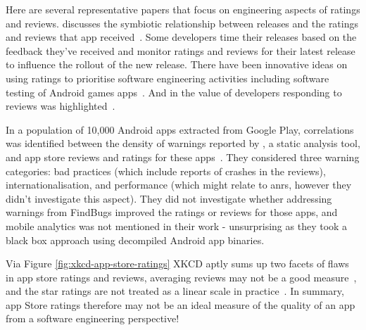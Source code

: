 Here are several representative papers that focus on engineering aspects of ratings and reviews.  \citeauthor{alsubaihin2019app_store_effects_on_software_engineering} discusses the symbiotic relationship between releases and the ratings and reviews that app received~. Some developers time their releases based on the feedback they've received and monitor ratings and reviews for their latest release to influence the rollout of the new release. There have been innovative ideas on using ratings to prioritise software engineering activities including software testing of Android games apps~. And in \citeauthor{greenheld2018_automating_developers_responses_to_app_reviews} the value of developers responding to reviews was highlighted~. 

In a population of 10,000 Android apps extracted from Google Play, correlations was identified between the density of warnings reported by , a static analysis tool, and app store reviews and ratings for these apps~. They considered three warning categories: bad practices (which include reports of crashes in the reviews), internationalisation, and performance (which might relate to \Glspl{anr}, however they didn't investigate this aspect). They did not investigate whether addressing warnings from FindBugs improved the ratings or reviews for those apps, and mobile analytics was not mentioned in their work - unsurprising as they took a black box approach using decompiled Android app binaries.

Via Figure \ref{fig:xkcd-app-store-ratings} XKCD aptly sums up two facets of flaws in app store ratings and reviews, averaging reviews may not be a good measure~, and the star ratings are not treated as a linear scale in practice~. In summary, app Store ratings therefore may not be an ideal measure of the quality of an app from a software engineering perspective!

\FloatBarrier

